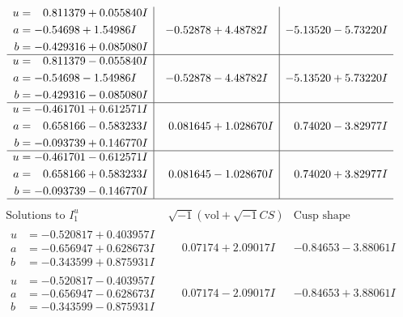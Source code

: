 \documentclass[1p]{elsarticle_modified}
\theoremstyle{definition}
\newcommand{\I}{\sqrt{-1}}
\begin{document}
$$\begin{array}{c|c|c}
\begin{aligned}
u &= \phantom{-}0.811379 + 0.055840 I \\
a &= -0.54698 + 1.54986 I \\
b &= -0.429316 + 0.085080 I\end{aligned}
 & -0.52878 + 4.48782 I & -5.13520 - 5.73220 I \\ \hline\begin{aligned}
u &= \phantom{-}0.811379 - 0.055840 I \\
a &= -0.54698 - 1.54986 I \\
b &= -0.429316 - 0.085080 I\end{aligned}
 & -0.52878 - 4.48782 I & -5.13520 + 5.73220 I \\ \hline\begin{aligned}
u &= -0.461701 + 0.612571 I \\
a &= \phantom{-}0.658166 - 0.583233 I \\
b &= -0.093739 + 0.146770 I\end{aligned}
 & \phantom{-}0.081645 + 1.028670 I & \phantom{-}0.74020 - 3.82977 I \\ \hline\begin{aligned}
u &= -0.461701 - 0.612571 I \\
a &= \phantom{-}0.658166 + 0.583233 I \\
b &= -0.093739 - 0.146770 I\end{aligned}
 & \phantom{-}0.081645 - 1.028670 I & \phantom{-}0.74020 + 3.82977 I\\
 \hline 
 \end{array}$$\newpage$$\begin{array}{c|c|c}  
\text{Solutions to }I^u_{1}& \I (\text{vol} + \sqrt{-1}CS) & \text{Cusp shape}\\
 \hline 
\begin{aligned}
u &= -0.520817 + 0.403957 I \\
a &= -0.656947 + 0.628673 I \\
b &= -0.343599 + 0.875931 I\end{aligned}
 & \phantom{-}0.07174 + 2.09017 I & -0.84653 - 3.88061 I \\ \hline\begin{aligned}
u &= -0.520817 - 0.403957 I \\
a &= -0.656947 - 0.628673 I \\
b &= -0.343599 - 0.875931 I\end{aligned}
 & \phantom{-}0.07174 - 2.09017 I & -0.84653 + 3.88061 I \\ \hline\begin{aligned}

\end{aligned}
\end{array}$$
\end{document}

